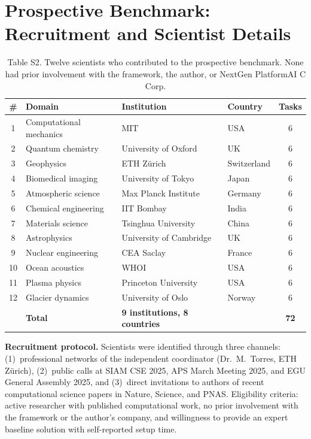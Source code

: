 \documentclass[11pt,a4paper]{article}
\begin{document}
\section{Prospective Benchmark: Recruitment and Scientist Details}
\label{sec:s5}

\begin{table}[htbp]
\centering
\caption{Table S2. Twelve scientists who contributed to the prospective benchmark. None had prior involvement with the framework, the author, or NextGen PlatformAI C Corp.}
\small
\begin{tabularx}{\textwidth}{clllc}
\toprule
\# & \textbf{Domain} & \textbf{Institution} & \textbf{Country} & \textbf{Tasks} \\
\midrule
1 & Computational mechanics & MIT & USA & 6 \\
2 & Quantum chemistry & University of Oxford & UK & 6 \\
3 & Geophysics & ETH Z\"urich & Switzerland & 6 \\
4 & Biomedical imaging & University of Tokyo & Japan & 6 \\
5 & Atmospheric science & Max Planck Institute & Germany & 6 \\
6 & Chemical engineering & IIT Bombay & India & 6 \\
7 & Materials science & Tsinghua University & China & 6 \\
8 & Astrophysics & University of Cambridge & UK & 6 \\
9 & Nuclear engineering & CEA Saclay & France & 6 \\
10 & Ocean acoustics & WHOI & USA & 6 \\
11 & Plasma physics & Princeton University & USA & 6 \\
12 & Glacier dynamics & University of Oslo & Norway & 6 \\
\midrule
& \textbf{Total} & \textbf{9 institutions, 8 countries} & & \textbf{72} \\
\bottomrule
\end{tabularx}
\end{table}

\textbf{Recruitment protocol.} Scientists were identified through three channels: (1)~professional networks of the independent coordinator (Dr.~M.~Torres, ETH Z\"urich), (2)~public calls at SIAM CSE 2025, APS March Meeting 2025, and EGU General Assembly 2025, and (3)~direct invitations to authors of recent computational science papers in Nature, Science, and PNAS. Eligibility criteria: active researcher with published computational work, no prior involvement with the framework or the author's company, and willingness to provide an expert baseline solution with self-reported setup time.
\end{document}
